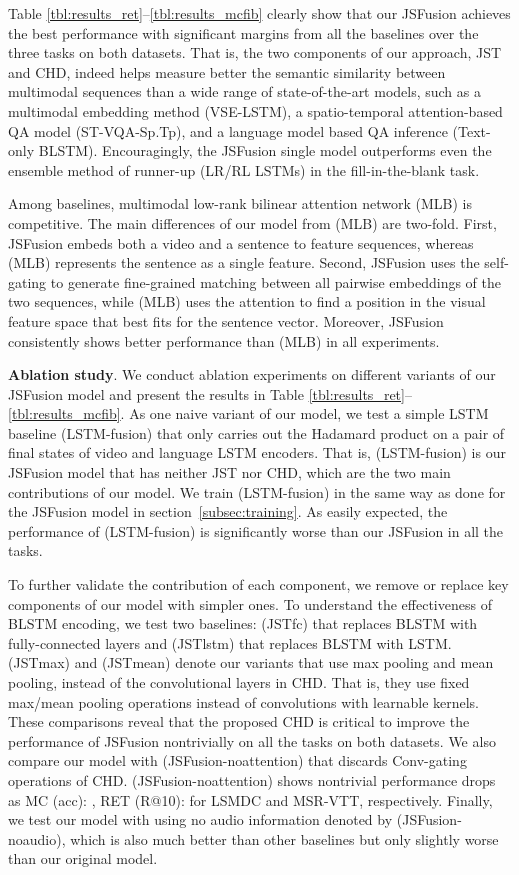 \documentclass[runningheads]{llncs}
\begin{document}
Table \ref{tbl:results_ret}--\ref{tbl:results_mcfib} clearly show that  our JSFusion achieves the best performance with significant margins from all the baselines over the three tasks on both datasets.
That is, the two components of our approach, JST and CHD, indeed helps measure better the semantic similarity between multimodal sequences than a wide range of state-of-the-art models, such as a multimodal embedding method  (VSE-LSTM), a spatio-temporal attention-based QA model (ST-VQA-Sp.Tp), and a language model based QA inference (Text-only BLSTM).   Encouragingly, the JSFusion single model outperforms even the ensemble method of runner-up (LR/RL LSTMs) in the fill-in-the-blank task.

Among baselines, multimodal low-rank bilinear attention network (MLB) \cite{Kim-iclr-2017} is competitive. 
The main differences of our model from (MLB) are two-fold.
First, JSFusion embeds both a video and a sentence to feature sequences, 
whereas (MLB) represents the sentence as a single feature.
Second, JSFusion uses the self-gating to generate fine-grained matching between all pairwise embeddings of  the two sequences, 
while (MLB) uses the attention to find a position in the visual feature space that best fits for the sentence vector.  Moreover, JSFusion consistently shows better performance than (MLB) in all experiments.




\textbf{Ablation study}.
We conduct ablation experiments on different variants of our JSFusion model and present the results in Table \ref{tbl:results_ret}--\ref{tbl:results_mcfib}.
As one naive variant of our model, we test a simple LSTM baseline (LSTM-fusion) that only carries out the Hadamard product on a pair of final states of video and language LSTM encoders. That is, (LSTM-fusion) is our JSFusion model that has neither JST nor CHD, which are the two main contributions of our model.
We train (LSTM-fusion) in the same way as done for the JSFusion model in section~\ref{subsec:training}.
As easily expected, the performance of (LSTM-fusion) is significantly worse than our JSFusion in all the tasks.

To further validate the contribution of each component, we remove or replace key components of our model with simpler ones.
To understand the effectiveness of BLSTM encoding, we test two baselines: (JSTfc) that replaces BLSTM with fully-connected layers and (JSTlstm) that replaces BLSTM with LSTM.
(JSTmax) and (JSTmean) denote our variants that use max pooling and mean pooling, instead of the  convolutional layers in CHD.
That is, they use fixed max/mean pooling operations instead of convolutions with learnable kernels.
These comparisons reveal that the proposed CHD is critical to improve the performance of JSFusion nontrivially on all the tasks on both datasets. 
We also compare our model with (JSFusion-noattention) that discards Conv-gating operations of CHD. 
(JSFusion-noattention) shows nontrivial performance drops as MC (acc): , RET (R@10):  for LSMDC and MSR-VTT, respectively.
Finally, we test our model with using no audio information denoted by (JSFusion-noaudio), 
which is also much better than other baselines but only slightly worse than our original model. 
\end{document}
